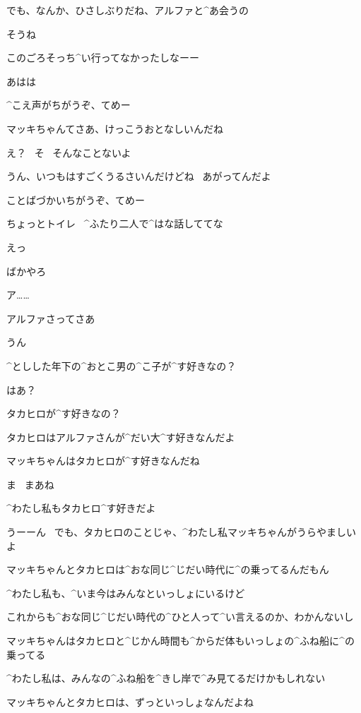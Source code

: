 \Takahiro でも、なんか、ひさしぶりだね、アルファと^{あ}{会}うの

\Alpha そうね

\Takahiro このごろそっち^{い}{行}ってなかったしなーー

\Takahiro あはは

\Makki ^{こえ}{声}がちがうぞ、てめー

\page[35]
\Alpha マッキちゃんてさあ、けっこうおとなしいんだね

\Makki え？
\ そ
\ そんなことないよ

\Takahiro うん、いつもはすごくうるさいんだけどね
\ あがってんだよ

\Makki ことばづかいちがうぞ、てめー

\Takahiro ちょっとトイレ
\ ^{ふたり}{二人}で^{はな}{話}しててな

\Makki えっ

\Makki ばかやろ

\page[36]
\Makki ア……

\Makki アルファさってさあ

\Alpha うん

\Makki ^{としした}{年下}の^{おとこ}{男}の^{こ}{子}が^{す}{好}きなの？

\Alpha はあ？

\page[37]
\Makki タカヒロが^{す}{好}きなの？

\Makki タカヒロはアルファさんが^{だい}{大}^{す}{好}きなんだよ

\Alpha マッキちゃんはタカヒロが^{す}{好}きなんだね

\Makki ま
\ まあね

\Alpha ^{わたし}{私}もタカヒロ^{す}{好}きだよ

\page[38]
\Alpha うーーん
\ でも、タカヒロのことじゃ、^{わたし}{私}マッキちゃんがうらやましいよ

\Alpha マッキちゃんとタカヒロは^{おな}{同}じ^{じだい}{時代}に^{の}{乗}ってるんだもん

\Alpha ^{わたし}{私}も、^{いま}{今}はみんなといっしょにいるけど

\Alpha これからも^{おな}{同}じ^{じだい}{時代}の^{ひと}{人}って^{い}{言}えるのか、わかんないし

\Alpha マッキちゃんはタカヒロと^{じかん}{時間}も^{からだ}{体}もいっしょの^{ふね}{船}に^{の}{乗}ってる

\Alpha ^{わたし}{私}は、みんなの^{ふね}{船}を^{きし}{岸}で^{み}{見}てるだけかもしれない

\page[39]
\Alpha マッキちゃんとタカヒロは、ずっといっしょなんだよね

